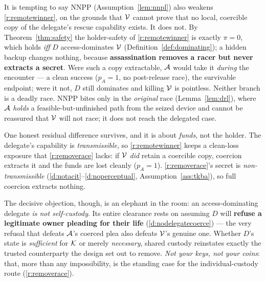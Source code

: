 \begin{remark}\label{rem:r2-cost}
It is tempting to say NNPP (Assumption~\ref{lem:nnpl}) also weakens
\ref{r:remotewinner}, on the grounds that $\mathcal{V}$ cannot prove that no local,
coercible copy of the delegate's rescue capability exists. It does not. By
Theorem~\ref{thm:safety} the holder-safety of \ref{r:remotewinner} is exactly
$\pi = 0$, which holds \emph{iff} $D$ access-dominates $\mathcal{V}$
(Definition~\ref{def:dominating}); a hidden backup changes nothing, because
\textbf{assassination removes a racer but never extracts a secret}. Were such a
copy extractable, $\mathcal{A}$ would take it \emph{during} the encounter --- a clean
success ($p_A = 1$, no post-release race), the survivable endpoint; were it not,
$D$ still dominates and killing $\mathcal{V}$ is pointless. Neither branch is a deadly
race. NNPP bites only in the \emph{original} race (Lemma~\ref{lem:drl}), where
$\mathcal{A}$ \emph{holds} a feasible-but-unfinished path from the seized device and
cannot be reassured that $\mathcal{V}$ will not race; it does not reach the delegated
case.

One honest residual difference survives, and it is about \emph{funds}, not the
holder. The delegate's capability is \emph{transmissible}, so \ref{r:remotewinner}
keeps a clean-loss exposure that \ref{r:removerace} lacks: if $\mathcal{V}$ \emph{did}
retain a coercible copy, coercion extracts it and the funds are lost cleanly
($p_A = 1$). \ref{r:removerace}'s secret is \emph{non-transmissible}
(\ref{d:notacit}--\ref{d:noperceptual}, Assumption~\ref{ass:tkba}), so full
coercion extracts nothing.

The decisive objection, though, is an elephant in the room: an access-dominating
delegate \emph{is not self-custody}. Its entire clearance rests on assuming $D$
will \textbf{refuse a legitimate owner pleading for their life}
(\ref{d:nodelegatecoerce}) --- the very refusal that defeats
$\mathcal{A}$'s coerced plea also defeats $\mathcal{V}$'s genuine one. Whether $D$'s
state is \emph{sufficient} for $\mathcal{K}$ or merely \emph{necessary}, shared custody
reinstates exactly the trusted counterparty the design set out to remove.
\emph{Not your keys, not your coins}: that, more than any impossibility, is the
standing case for the individual-custody route (\ref{r:removerace}).
\end{remark}

